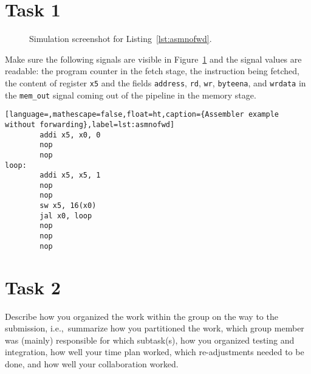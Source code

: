 \documentclass[11pt,a4paper,titlepage,oneside]{article}
\begin{document}
\maketitle

\section*{Task 1}

\begin{figure}[ht!]
  \centering
  \caption{Simulation screenshot for Listing~\ref{lst:asmnofwd}.}
  \label{fig:sim}
\end{figure}

Make sure the following signals are visible in Figure~\ref{fig:sim} and the 
signal values are readable:
the program counter in the fetch stage, the instruction being fetched, the 
content of register \texttt{x5} and the fields \texttt{address}, \texttt{rd}, 
\texttt{wr}, \texttt{byteena}, and \texttt{wrdata} in the \texttt{mem\_out} 
signal coming out of the pipeline in the memory stage.

\begin{lstlisting}[language=,mathescape=false,float=ht,caption={Assembler example without forwarding},label=lst:asmnofwd]
        addi x5, x0, 0
        nop
        nop
loop:
        addi x5, x5, 1
        nop
        nop
        sw x5, 16(x0)
        jal x0, loop
        nop
        nop
        nop
\end{lstlisting}


\clearpage

\section*{Task 2}
Describe how you organized the work within the group on the way to the 
submission, i.e.,~summarize how you partitioned the work, which group 
member was (mainly) responsible for which subtask(s), how you organized 
testing and integration, how well your time plan worked, which 
re-adjustments needed to be done, and how well your collaboration 
worked. \\
\end{document}
